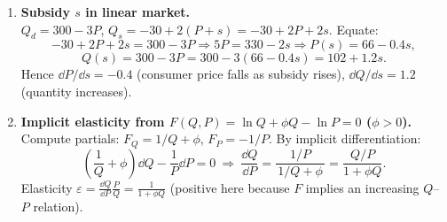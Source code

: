 \documentclass[12pt]{article}
\begin{document}
\begin{enumerate}[resume]
\item \textbf{Subsidy $s$ in linear market.}\\
$Q_d=300-3P$, $Q_s=-30+2(P+s)=-30+2P+2s$. Equate:
\[
-30+2P+2s=300-3P\Rightarrow 5P=330-2s\Rightarrow \boxed{P(s)=66-0.4s},
\]
\[
Q(s)=300-3P=300-3(66-0.4s)=\boxed{102+1.2s}.
\]
Hence $\boxed{\dd P/\dd s=-0.4}$ (consumer price falls as subsidy rises), $\boxed{\dd Q/\dd s=1.2}$ (quantity increases).


\item \textbf{Implicit elasticity from $F(Q,P)=\ln Q+\phi Q-\ln P=0$ ($\phi>0$).}\\
Compute partials: $F_Q=1/Q+\phi$, $F_P=-1/P$. By implicit differentiation:
\[
\left(\frac{1}{Q}+\phi\right)\dd Q-\frac{1}{P}\dd P=0\ \Rightarrow\ \frac{\dd Q}{\dd P}=\frac{1/P}{\,1/Q+\phi\,}=\frac{Q/P}{1+\phi Q}.
\]
Elasticity $\displaystyle \varepsilon=\frac{\dd Q}{\dd P}\frac{P}{Q}=\boxed{\frac{1}{1+\phi Q}}$ (positive here because $F$ implies an increasing $Q$--$P$ relation).
\end{enumerate}
\end{document}
